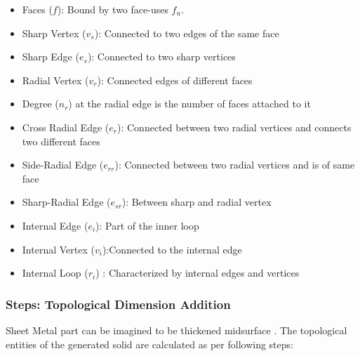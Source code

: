 	\begin{itemize} 
	[noitemsep,topsep=2pt,parsep=2pt,partopsep=2pt,label={}]\label{list_topos}
	\item Faces ($f$): Bound by two face-uses $f_u$.
	
	\item Sharp Vertex ($v_s$): Connected to two edges of the same face
	\item Sharp Edge ($e_s$): Connected to two sharp vertices

	\item Radial Vertex ($v_{r}$): Connected edges of different faces
	\item Degree ($n_{r}$) at the radial edge is the number of faces attached to it 
	\item Cross Radial Edge ($e_{r}$): Connected between two radial vertices and connects two different faces
	\item Side-Radial  Edge ($e_{rr}$): Connected between two radial vertices and is of same face
	\item Sharp-Radial Edge ($e_{sr}$): Between sharp and radial vertex
	\item Internal Edge ($e_i$): Part of the inner loop
	\item Internal Vertex ($v_i$):Connected to the internal edge
	\item Internal Loop ($r_i$) : Characterized by internal edges and vertices
	\end{itemize}

\subsubsection{Steps: Topological Dimension Addition}
Sheet Metal part can be imagined to be thickened midsurface \cite{SHLee2001}. The topological entities of the generated solid are calculated as per following steps: %





